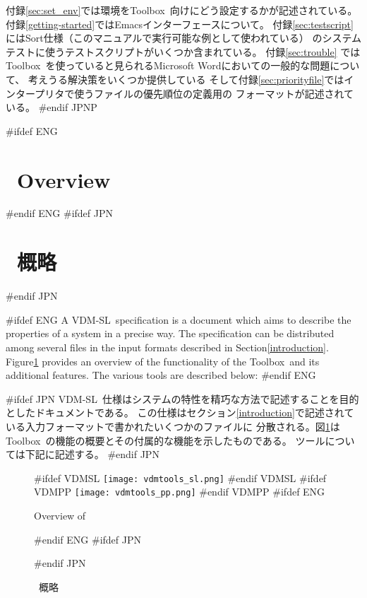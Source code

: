 \documentclass[\pformat,12pt]{article}
\newcommand{\vdmslpp}{VDM-SL}
\newcommand{\Toolbox}{Toolbox}
\newcommand{\vdmslpp}{VDM++}
\newcommand{\Toolbox}{Toolbox}
\begin{document}
付録\ref{sec:set_env}では環境を\Toolbox\ 向けにどう設定するかが記述されている。
付録\ref{getting-started}ではEmacsインターフェースについて。
付録\ref{sec:testscript}にはSort仕様（このマニュアルで実行可能な例として使われている）
のシステムテストに使うテストスクリプトがいくつか含まれている。
付録\ref{sec:trouble} では\Toolbox\ を使っていると見られるMicrosoft Wordにおいての一般的な問題について、
考えうる解決策をいくつか提供している
{そして付録\ref{sec:priorityfile}ではインタープリタで使うファイルの優先順位の定義用の
フォーマットが記述されている。}
#endif JPNP

\newpage

#ifdef ENG
\section{\protect\VDMTools\ Overview}\label{sec:overview}
#endif ENG
#ifdef JPN
\section{\protect\VDMTools\ 概略}\label{sec:overview}
#endif JPN

#ifdef ENG
A \vdmslpp\ specification is a document which aims to describe the
properties of a system in a precise way. The specification can be
distributed among several files in the input formats described in
Section\ref{introduction}.  Figure\ref{fig:toolbox} provides an
overview of the functionality of the \Toolbox\ and its additional
features. The various tools are described below:
#endif ENG

#ifdef JPN
\vdmslpp\ 仕様はシステムの特性を精巧な方法で記述することを目的としたドキュメントである。
この仕様はセクション\ref{introduction}で記述されている入力フォーマットで書かれたいくつかのファイルに
分散される。図\ref{fig:toolbox}は\Toolbox\ の機能の概要とその付属的な機能を示したものである。
ツールについては下記に記述する。
#endif JPN

\begin{figure}
\begin{center}

#ifdef VDMSL
\texttt{[image: vdmtools\_sl.png]}
#endif VDMSL
#ifdef VDMPP
\texttt{[image: vdmtools\_pp.png]}
#endif VDMPP
#ifdef ENG
\caption{Overview of \protect\VDMTools}
#endif ENG
#ifdef JPN
\caption{\protect\VDMTools\ 概略}
#endif JPN
\label{fig:toolbox}
\end{center}
\end{figure}
\end{document}

